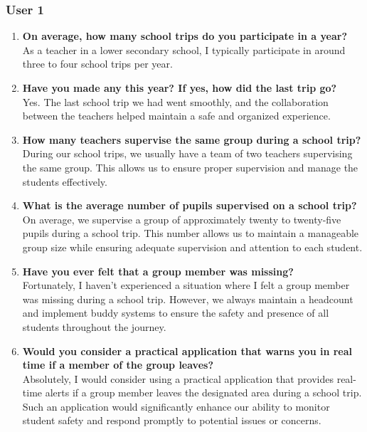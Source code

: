 \subsubsection*{User 1}
\begin{enumerate}
\item \textbf{On average, how many school trips do you participate in a year?}
\\ As a teacher in a lower secondary school, I typically participate in around three to four school trips per year.
\item \textbf{Have you made any this year? If yes, how did the last trip go?}
\\ Yes. The last school trip we had went smoothly, and the collaboration between the teachers helped maintain a safe and organized experience.
\item \textbf{How many teachers supervise the same group during a school trip?}
\\ During our school trips, we usually have a team of two teachers supervising the same group. This allows us to ensure proper supervision and manage the students effectively.
\item \textbf{What is the average number of pupils supervised on a school trip?}
\\ On average, we supervise a group of approximately twenty to twenty-five pupils during a school trip. This number allows us to maintain a manageable group size while ensuring adequate supervision and attention to each student.
\item \textbf{Have you ever felt that a group member was missing?}
\\ Fortunately, I haven't experienced a situation where I felt a group member was missing during a school trip. However, we always maintain a headcount and implement buddy systems to ensure the safety and presence of all students throughout the journey.
\item \textbf{Would you consider a practical application that warns you in real time if a member of the group leaves?}
\\ Absolutely, I would consider using a practical application that provides real-time alerts if a group member leaves the designated area during a school trip.
Such an application would significantly enhance our ability to monitor student safety and respond promptly to potential issues or concerns.
\end{enumerate}

